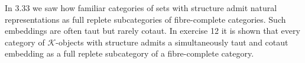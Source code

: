 In 3.33 we saw how familiar categories of sets with structure admit natural representations as full replete subcategories of fibre-complete categories. Such embeddings are often taut but rarely cotaut. In exercise 12 it is shown that every category of $\mathcal{K}$-objects with structure admits a simultaneously taut and cotaut embedding as a full replete subcategory of a fibre-complete category.
